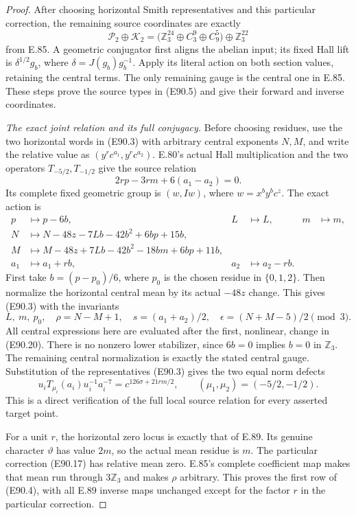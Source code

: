 \begin{proof}
After choosing horizontal Smith representatives
and this particular correction, the remaining
source coordinates are exactly
\[
 \mathcal P_2\oplus\mathcal K_2
   =\bigl(\mathbb Z_3^{24}\oplus C_3^9\oplus C_9^5\bigr)
                     \oplus\mathbb Z_3^{22}
 \tag{E90.18}
\]
from E.85. A geometric conjugator first aligns
the abelian input; its fixed Hall lift is
$\delta^{1/2}g_b$, where $\delta=J(g_b)g_b^{-1}$.
Apply its literal action on both section values,
retaining the central terms. The only remaining
gauge is the central one in E.85. These steps
prove the source types in (E90.5) and give their
forward and inverse coordinates.

\emph{The exact joint relation and its full conjugacy.}
Before choosing residues, use the two horizontal
words in (E90.3) with arbitrary central exponents
$N,M$, and write the relative value as
$(y^r c^{a_1},y^r c^{a_2})$.
E.80's actual Hall multiplication and the two
operators $T_{-5/2},T_{-1/2}$ give the source
relation
\[
                    2rp-3rm+6(a_1-a_2)=0.
 \tag{E90.19}
\]
Its complete fixed geometric group is
$(w,Iw)$, where $w=x^b y^b c^z$.
The exact action is
\[
\begin{aligned}
 p&\longmapsto p-6b,& L&\longmapsto L,&m&\longmapsto m,\\
 N&\longmapsto N-48z-7Lb-42b^2+6bp+15b,\\
 M&\longmapsto M-48z+7Lb-42b^2-18bm+6bp+11b,\\
 a_1&\longmapsto a_1+rb,&a_2&\longmapsto a_2-rb.
\end{aligned}
 \tag{E90.20}
\]
First take $b=(p-p_0)/6$, where $p_0$ is the
chosen residue in $\{0,1,2\}$. Then normalize
the horizontal central mean by its actual
$-48z$ change. This gives (E90.3) with the
invariants
\[
  L,\ m,\ p_0,\quad\rho=N-M+1,\quad
  s=(a_1+a_2)/2,\quad
  \epsilon=(N+M-5)/2\pmod3.
 \tag{E90.21}
\]
All central expressions here are evaluated
after the first, nonlinear, change in (E90.20).
There is no nonzero lower stabilizer, since
$6b=0$ implies $b=0$ in $\mathbb Z_3$.
The remaining central normalization is exactly
the stated central gauge. Substitution of the
representatives (E90.3) gives the two equal
norm defects
\[
       u_iT_{\mu_i}(a_i)u_i^{-1}a_i^{-7}
                     =c^{126\sigma+21rm/2},
           \qquad(\mu_1,\mu_2)=(-5/2,-1/2).
 \tag{E90.22}
\]
This is a direct verification of the full
local source relation for every asserted
target point.

For a unit $r$, the horizontal zero locus is
exactly that of E.89. Its genuine character
$\vartheta$ has value $2m$, so the actual mean
residue is $m$. The particular correction
(E90.17) has relative mean zero. E.85's complete
coefficient map makes that mean run through
$3\mathbb Z_3$ and makes $\rho$ arbitrary.
This proves the first row of (E90.4), with all
E.89 inverse maps unchanged except for the
factor $r$ in the particular correction.


\end{proof}
